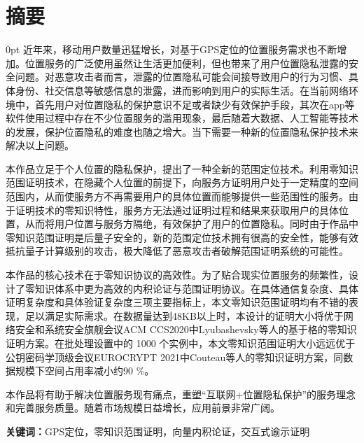 \documentclass[zihao=-4]{ctexart}
\newcommand{\setParDis}{\setlength {\parskip} {0pt} }
\begin{document}
\section*{摘要}
\begin{spacing}{1.5}
  \setParDis %
  近年来，移动用户数量迅猛增长，对基于GPS定位的位置服务需求也不断增加。位置服务的广泛使用虽然让生活更加便利，但也带来了用户位置隐私泄露的安全问题。对恶意攻击者而言，泄露的位置隐私可能会间接导致用户的行为习惯、具体身份、社交信息等敏感信息的泄露，进而影响到用户的实际生活。在当前网络环境中，首先用户对位置隐私的保护意识不足或者缺少有效保护手段，其次在app等软件使用过程中存在不少位置服务的滥用现象，最后随着大数据、人工智能等技术的发展，保护位置隐私的难度也随之增大。当下需要一种新的位置隐私保护技术来解决以上问题。\par
本作品立足于个人位置的隐私保护，提出了一种全新的范围定位技术。利用零知识范围证明技术，在隐藏个人位置的前提下，向服务方证明用户处于一定精度的空间范围内，从而使服务方不再需要用户的具体位置而能够提供一些范围性的服务。由于证明技术的零知识特性，服务方无法通过证明过程和结果来获取用户的具体位置，从而将用户位置与服务方隔绝，有效保护了用户的位置隐私。同时由于作品中零知识范围证明是后量子安全的，新的范围定位技术拥有很高的安全性，能够有效抵抗量子计算级别的攻击，极大降低了恶意攻击者破解范围证明系统的可能性。\par
本作品的核心技术在于零知识协议的高效性。为了贴合现实位置服务的频繁性，设计了零知识体系中更为高效的内积论证与范围证明协议。在具体通信复杂度、具体证明复杂度和具体验证复杂度三项主要指标上，本文零知识范围证明均有不错的表现，足以满足实际需求。在数据量达到48KB以上时，本设计的证明大小将优于网络安全和系统安全旗舰会议ACM \quad CCS\quad 2020中Lyubashevsky等人的基于格的零知识证明方案。在批处理设置中的 1000 个实例中，本文零知识范围证明大小远远优于公钥密码学顶级会议EUROCRYPT \quad 2021中Couteau等人的零知识证明方案，同数据规模下空间占用率减小约90 \%。\par
本作品将有助于解决位置服务现有痛点，重塑“互联网+位置隐私保护”的服务理念和完善服务质量。随着市场规模日益增长，应用前景非常广阔。\par
\end{spacing}
    
\textbf{关键词：}GPS定位，零知识范围证明，向量内积论证，交互式谕示证明
\newpage
\end{document}
